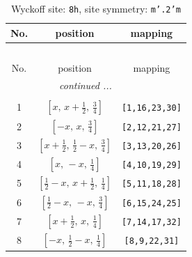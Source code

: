 \documentclass[fleqn,8pt]{jsarticle}
\begin{document}
\begin{longtable}{ccc}
\caption{Wyckoff site: {\tt 8h}, site symmetry: {\tt m'.2'm}}
 \\
 \hline \hline
No. & position & mapping \\ \hline \endfirsthead

\multicolumn{2}{l}{\tablename\ \thetable{}} \\
 \hline \hline
No. & position & mapping \\ \hline \endhead

 \hline \hline
\multicolumn{2}{r}{\footnotesize\it continued ...} \\ \endfoot

 \hline \hline
\multicolumn{2}{r}{} \\ \endlastfoot

1 & $\left[ x,\, x + \frac{1}{2},\, \frac{3}{4} \right]$ & {\tt [1,16,23,30]} \\ \hline
2 & $\left[ - x,\, x,\, \frac{3}{4} \right]$ & {\tt [2,12,21,27]} \\ \hline
3 & $\left[ x + \frac{1}{2},\, \frac{1}{2} - x,\, \frac{3}{4} \right]$ & {\tt [3,13,20,26]} \\ \hline
4 & $\left[ x,\, - x,\, \frac{1}{4} \right]$ & {\tt [4,10,19,29]} \\ \hline
5 & $\left[ \frac{1}{2} - x,\, x + \frac{1}{2},\, \frac{1}{4} \right]$ & {\tt [5,11,18,28]} \\ \hline
6 & $\left[ \frac{1}{2} - x,\, - x,\, \frac{3}{4} \right]$ & {\tt [6,15,24,25]} \\ \hline
7 & $\left[ x + \frac{1}{2},\, x,\, \frac{1}{4} \right]$ & {\tt [7,14,17,32]} \\ \hline
8 & $\left[ - x,\, \frac{1}{2} - x,\, \frac{1}{4} \right]$ & {\tt [8,9,22,31]} \\
\end{longtable}
\renewcommand{\arraystretch}{1.2}
\end{document}
